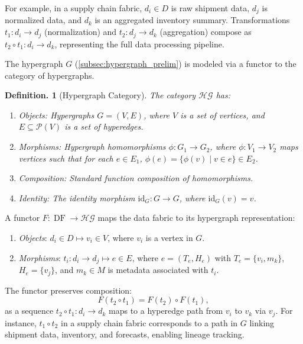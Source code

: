 \documentclass{amsart}
\newtheorem{defn}[thm]{Definition.}
\DeclareMathOperator\DF{DF}
\begin{document}
For example, in a supply chain fabric, \( d_i \in D \) is raw shipment data, \( d_j \) is normalized data, and \( d_k \) is an aggregated inventory summary. Transformations \( t_1: d_i \to d_j \) (normalization) and \( t_2: d_j \to d_k \) (aggregation) compose as \( t_2 \circ t_1: d_i \to d_k \), representing the full data processing pipeline.

The hypergraph \( G \) (\cref{subsec:hypergraph_prelim}) is modeled via a functor to the category of hypergraphs.

\begin{defn}[Hypergraph Category]
The category \( \mathcal{HG} \) has:
\begin{enumerate}
    \item \emph{Objects}: Hypergraphs \( G = (V, E) \), where \( V \) is a set of vertices, and \( E \subseteq \mathcal{P}(V) \) is a set of hyperedges.
    \item \emph{Morphisms}: Hypergraph homomorphisms \( \phi: G_1 \to G_2 \), where \( \phi: V_1 \to V_2 \) maps vertices such that for each \( e \in E_1 \), \( \phi(e) = \{\phi(v) \mid v \in e\} \in E_2 \).
    \item \emph{Composition}: Standard function composition of homomorphisms.
    \item \emph{Identity}: The identity morphism \( \text{id}_G: G \to G \), where \( \text{id}_G(v) = v \).
\end{enumerate}
\end{defn}

A functor \( F: \DF \to \mathcal{HG} \) maps the data fabric to its hypergraph representation:
\begin{enumerate}
    \item \emph{Objects}: \( d_i \in D \mapsto v_i \in V \), where \( v_i \) is a vertex in \( G \).
    \item \emph{Morphisms}: \( t_i: d_i \to d_j \mapsto e \in E \), where \( e = (T_e, H_e) \) with \( T_e = \{v_i, m_k\} \), \( H_e = \{v_j\} \), and \( m_k \in M \) is metadata associated with \( t_i \).
\end{enumerate}

The functor preserves composition:
\[
F(t_2 \circ t_1) = F(t_2) \circ F(t_1),
\]
as a sequence \( t_2 \circ t_1: d_i \to d_k \) maps to a hyperedge path from \( v_i \) to \( v_k \) via \( v_j \). For instance, \( t_1 \circ t_2 \) in a supply chain fabric corresponds to a path in \( G \) linking shipment data, inventory, and forecasts, enabling lineage tracking.
\end{document}

